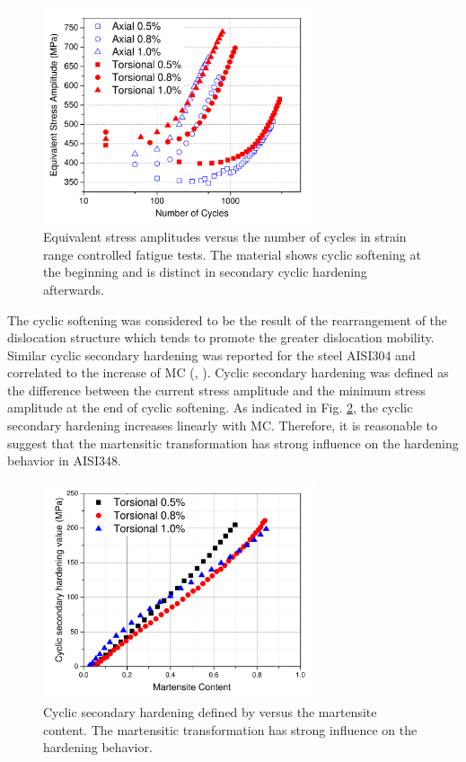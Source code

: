 \documentclass[final,5p,times,onecolumn,10pt,sort&compress]{elsarticle}
\begin{document}
\begin{figure}[!htb]
  \begin{center}
  \includegraphics[width=8cm]{total1.pdf}
  \caption{Equivalent stress amplitudes versus the number of cycles in strain range controlled fatigue tests. The material shows cyclic softening at the beginning and is distinct in secondary cyclic hardening afterwards. }
  \label{fig:total1}
  \end{center}
\end{figure}

The cyclic softening was considered to be the result of the rearrangement of the dislocation structure which tends to promote the greater dislocation mobility. Similar cyclic secondary hardening was reported for the steel AISI304 and correlated to the increase of  MC (\citeauthor{Pegues2017Cyclic}, \citeyear{Pegues2017Cyclic}). Cyclic secondary hardening  was defined as the difference between the current stress amplitude and the minimum stress amplitude at the end of cyclic softening. As indicated in Fig. \ref{fig:SecondaryHardening}, the cyclic secondary hardening  increases linearly with  MC. Therefore, it is reasonable to suggest that the martensitic transformation has strong influence on the hardening behavior in AISI348.

\begin{figure}[!h]
  \begin{center}
  \includegraphics[width=8cm]{SecondaryHardening.pdf}
  \caption{Cyclic secondary hardening defined by \cite{Pegues2017Cyclic} versus the martensite content. The martensitic transformation has strong influence on the hardening behavior.}
  \label{fig:SecondaryHardening}
  \end{center}
\end{figure}
\end{document}
